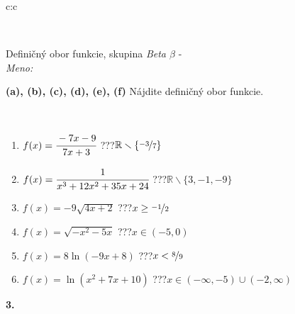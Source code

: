 \documentclass[10pt]{report}
\begin{document}
\begin{tabular}{c:c}
\begin{minipage}[c][104.5mm][t]{0.5\linewidth}
\begin{center}
\begin{minipage}{0.20\linewidth}
\end{minipage}
\end{center}
\end{minipage}
\\ \hdashline
\begin{minipage}[c][104.5mm][t]{0.5\linewidth}
\begin{center}
\vspace{7mm}
{\huge Definičný obor funkcie, skupina \textit{Beta $\beta$} -}\\[5mm]
\textit{Meno:}\phantom{xxxxxxxxxxxxxxxxxxxxxxxxxxxxxxxxxxxxxxxxxxxxxxxxxxxxxxxxxxxxxxxxx}\\[5mm]
\begin{minipage}{0.95\linewidth}
\begin{center}
{
\textbf{(a), (b), (c), (d), (e), (f)} Nájdite definičný obor funkcie. \\[1mm]
\phantom{x}
}
\end{center}
\end{minipage}
\\[4mm]
\begin{minipage}{0.79\linewidth}
\begin{center}
\begin{varwidth}{\linewidth}
\begin{enumerate}
\normalsizerrr
\item $f(x)=\cfrac{-7x-9}{7x+3}$\quad \dotfill\; ???\;\dotfill \quad $ \mathbb{R} \smallsetminus\{\nicefrac{-3}{7} \}$
\item $f(x)=\cfrac{1}{x^3+12x^2+35x+24}$\quad \dotfill\; ???\;\dotfill \quad $ \mathbb{R} \smallsetminus\{3,-1,-9 \}$
\item $f(x)=-9\sqrt{4x+2}$\quad \dotfill\; ???\;\dotfill \quad $x\geq\nicefrac{-1}{2}$
\item $f(x)=\sqrt{-x^2-5x}$\quad \dotfill\; ???\;\dotfill \quad $x\in(-5 , 0)$
\item $f(x)=8\ln{(-9x+8)}$\quad \dotfill\; ???\;\dotfill \quad $x<\nicefrac{8}{9}$
\item $f(x)=\ln{(x^2+7x+10)}$\quad \dotfill\; ???\;\dotfill \quad $x\in(-\infty , -5)\cup(-2 , \infty)$
\end{enumerate}
\end{varwidth}
\end{center}
\end{minipage}
\begin{minipage}{0.20\linewidth}
\begin{center}
{\Huge\bfseries 3.} \\[2mm]

\end{center}
\end{minipage}
\end{center}
\end{minipage}
\end{tabular}
\end{document}
